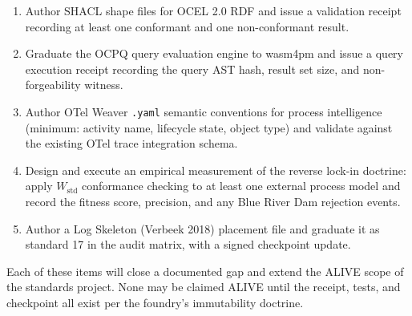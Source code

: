 \begin{enumerate}
  \item Author SHACL shape files for OCEL 2.0 RDF and issue a validation receipt recording
        at least one conformant and one non-conformant result.
  \item Graduate the OCPQ query evaluation engine to wasm4pm and issue a query execution
        receipt recording the query AST hash, result set size, and non-forgeability witness.
  \item Author OTel Weaver \texttt{.yaml} semantic conventions for process intelligence
        (minimum: activity name, lifecycle state, object type) and validate against the
        existing OTel trace integration schema.
  \item Design and execute an empirical measurement of the reverse lock-in doctrine: apply
        $W_{\text{std}}$ conformance checking to at least one external process model and
        record the fitness score, precision, and any Blue River Dam rejection events.
  \item Author a Log Skeleton (Verbeek 2018) placement file and graduate it as standard 17
        in the audit matrix, with a signed checkpoint update.
\end{enumerate}

Each of these items will close a documented gap and extend the ALIVE scope of the standards
project. None may be claimed ALIVE until the receipt, tests, and checkpoint all exist per
the foundry's immutability doctrine.
